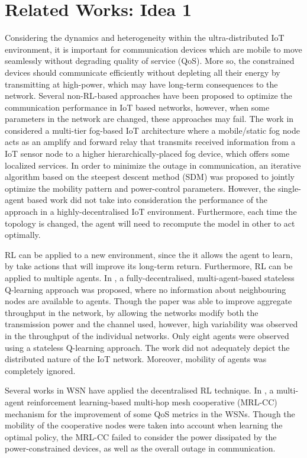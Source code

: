 \documentclass[journal]{IEEEtran}
\begin{document}
\section{Related Works: Idea 1}
Considering the dynamics and heterogeneity within the ultra-distributed IoT environment, it is important for communication devices which are mobile to move seamlessly without degrading quality of service (QoS). More so, the constrained devices should communicate efficiently without depleting all their energy by transmitting at high-power, which may have long-term consequences to the network. Several non-RL-based approaches have been proposed to optimize the communication performance in IoT based networks, however, when some parameters in the network are changed, these approaches may fail.
The work in~\cite{OmoniwaRelay2018} considered a multi-tier fog-based IoT architecture where a mobile/static fog node acts as an amplify and forward relay that transmits received information from a IoT sensor node to a higher hierarchically-placed fog device, which offers some localized services. In order to minimize the outage in communication, an iterative algorithm based on the steepest descent method (SDM) was proposed to jointly optimize the mobility pattern and power-control parameters. However, the single-agent based work did not take into consideration the performance of the approach in a highly-decentralised IoT environment. Furthermore, each time the topology is changed, the agent will need to recompute the model in other to act optimally.

RL can be applied to a new environment, since the it allows the agent to learn, by take actions that will improve its long-term return. Furthermore, RL can be applied to multiple agents. In \cite{Wilhelmi2017}, a fully-decentralised, multi-agent-based stateless Q-learning approach was proposed, where no information about neighbouring nodes are available to agents. Though the paper was able to improve aggregate throughput in the network, by allowing the networks modify both the transmission power and the channel used, however, high variability was observed in the throughput of the individual networks. Only eight agents were observed using a stateless Q-learning approach. The work did not adequately depict the distributed nature of the IoT network. Moreover, mobility of agents was completely ignored.

Several works in WSN have applied the decentralised RL technique. In \cite{Liang2009}, a multi-agent reinforcement learning-based multi-hop mesh cooperative (MRL-CC) mechanism for the improvement of some QoS metrics in the WSNs. Though the mobility of the cooperative nodes were taken into account when learning the optimal policy, the MRL-CC failed to consider the power dissipated by the power-constrained devices, as well as the overall outage in communication.
\end{document}

